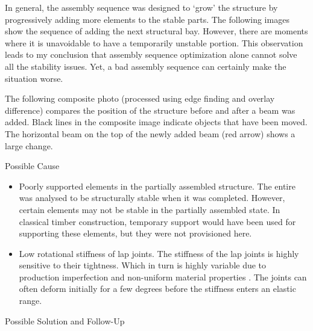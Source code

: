 In general, the assembly sequence was designed to ‘grow’ the structure by progressively adding more elements to the stable parts. The following images show the sequence of adding the next structural bay. However, there are moments where it is unavoidable to have a temporarily unstable portion. This observation leads to my conclusion that assembly sequence optimization alone cannot solve all the stability issues. Yet, a bad assembly sequence can certainly make the situation worse.

The following composite photo (processed using edge finding and overlay difference) compares the position of the structure before and after a beam was added. Black lines in the composite image indicate objects that have been moved. The horizontal beam on the top of the newly added beam (red arrow) shows a large change.

Possible Cause
\begin{itemize}
    \item Poorly supported elements in the partially assembled structure. The entire was analysed to be structurally stable when it was completed. However, certain elements may not be stable in the partially assembled state. In classical timber construction, temporary support would have been used for supporting these elements, but they were not provisioned here.
    \item Low rotational stiffness of lap joints. The stiffness of the lap joints is highly sensitive to their tightness. Which in turn is highly variable due to production imperfection and non-uniform material properties \parencite{qinRotationalBehaviorColumn2018}. The joints can often deform initially for a few degrees before the stiffness enters an elastic range.
\end{itemize}

Possible Solution and Follow-Up

